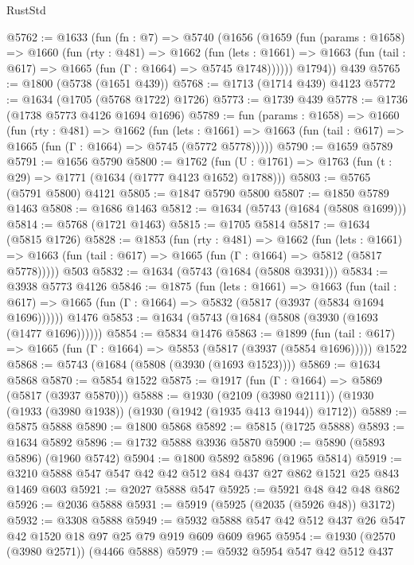 \begin{lexlean}{RustStd}
\begin{coremodule}
@5762 := @1633
    (fun (fn : @7) =>
    @5740
      (@1656
        (@1659
          (fun (params : @1658) =>
          @1660
            (fun (rty : @481) =>
            @1662
              (fun (lets : @1661) =>
              @1663 (fun (tail : @617) => @1665 (fun (Γ : @1664) => @5745 @1748))))))
        @1794))
    @439
@5765 := @1800 (@5738 (@1651 @439))
@5768 := @1713 (@1714 @439) @4123
@5772 := @1634 (@1705 (@5768 @1722) @1726)
@5773 := @1739 @439
@5778 := @1736 (@1738 @5773 @4126 @1694 @1696)
@5789 := fun (params : @1658) =>
  @1660
    (fun (rty : @481) =>
    @1662
      (fun (lets : @1661) =>
      @1663 (fun (tail : @617) => @1665 (fun (Γ : @1664) => @5745 (@5772 @5778)))))
@5790 := @1659 @5789
@5791 := @1656 @5790
@5800 := @1762 (fun (U : @1761) => @1763 (fun (t : @29) => @1771 (@1634 (@1777 @4123 @1652) @1788)))
@5803 := @5765 (@5791 @5800) @4121
@5805 := @1847 @5790 @5800
@5807 := @1850 @5789 @1463
@5808 := @1686 @1463
@5812 := @1634 (@5743 (@1684 (@5808 @1699)))
@5814 := @5768 (@1721 @1463)
@5815 := @1705 @5814
@5817 := @1634 (@5815 @1726)
@5828 := @1853
    (fun (rty : @481) =>
    @1662
      (fun (lets : @1661) =>
      @1663 (fun (tail : @617) => @1665 (fun (Γ : @1664) => @5812 (@5817 @5778)))))
    @503
@5832 := @1634 (@5743 (@1684 (@5808 @3931)))
@5834 := @3938 @5773 @4126
@5846 := @1875
    (fun (lets : @1661) =>
    @1663
      (fun (tail : @617) => @1665 (fun (Γ : @1664) => @5832 (@5817 (@3937 (@5834 @1694 @1696))))))
    @1476
@5853 := @1634 (@5743 (@1684 (@5808 (@3930 (@1693 (@1477 @1696))))))
@5854 := @5834 @1476
@5863 := @1899
    (fun (tail : @617) => @1665 (fun (Γ : @1664) => @5853 (@5817 (@3937 (@5854 @1696)))))
    @1522
@5868 := @5743 (@1684 (@5808 (@3930 (@1693 @1523))))
@5869 := @1634 @5868
@5870 := @5854 @1522
@5875 := @1917 (fun (Γ : @1664) => @5869 (@5817 (@3937 @5870)))
@5888 := @1930
    (@2109 (@3980 @2111))
    (@1930 (@1933 (@3980 @1938)) (@1930 (@1942 (@1935 @413 @1944)) @1712))
@5889 := @5875 @5888
@5890 := @1800 @5868
@5892 := @5815 (@1725 @5888)
@5893 := @1634 @5892
@5896 := @1732 @5888 @3936 @5870
@5900 := @5890 (@5893 @5896) (@1960 @5742)
@5904 := @1800 @5892 @5896 (@1965 @5814)
@5919 := @3210 @5888 @547 @547 @42 @42 @512 @84 @437 @27 @862 @1521 @25 @843 @1469 @603
@5921 := @2027 @5888 @547
@5925 := @5921 @48 @42 @48 @862
@5926 := @2036 @5888
@5931 := @5919 (@5925 (@2035 (@5926 @48)) @3172)
@5932 := @3308 @5888
@5949 := @5932 @5888 @547 @42 @512 @437 @26 @547 @42 @1520 @18 @97 @25 @79 @919 @609 @609 @965
@5954 := @1930 (@2570 (@3980 @2571)) (@4466 @5888)
@5979 := @5932
    @5954
    @547
    @42
    @512
    @437

\end{coremodule}
\end{lexlean}
